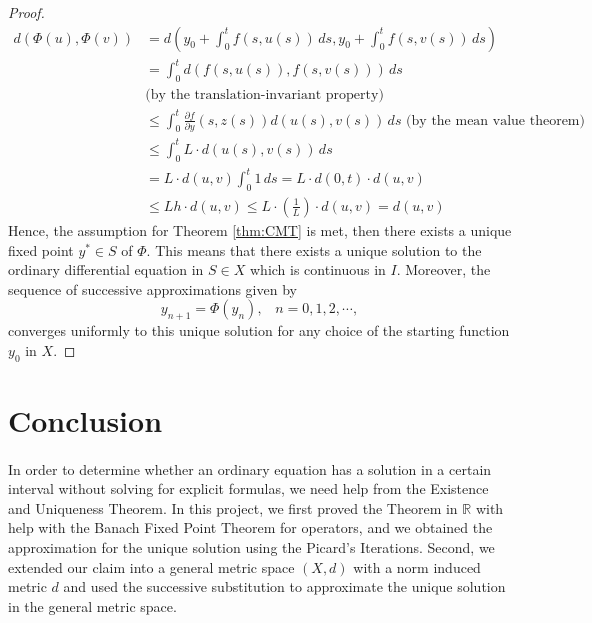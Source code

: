 \documentclass{article}
\theoremstyle{definition}
\theoremstyle{remark}
\theoremstyle{example}
\begin{document}
\begin{proof}
    \begin{align}
        d(\Phi(u),\Phi(v)) &= d\left(y_0+\int_{0}^{t}{f(s,u(s))}\,ds, y_0+\int_{0}^{t}{f(s,v(s))}\,ds\right)\\
        &= \int_{0}^{t}{d(f(s,u(s)), f(s,v(s)))}\,ds\\
        &\text{(by the translation-invariant property)}\\
        &\leq \int_{0}^{t}{\tfrac{\partial f}{\partial y}(s,z(s))d(u(s),v(s))}\,ds \text{ (by the mean value theorem)}\\
        &\leq \int_{0}^{t}{L \cdot d(u(s),v(s))}\,ds\\
        &= L\cdot d(u,v) \int_{0}^{t}{1}\,ds = L \cdot d(0,t) \cdot d(u,v)\\
        &\leq Lh\cdot d(u,v) \leq L \cdot (\tfrac{1}{L})\cdot d(u,v) = d(u,v)
    \end{align}
    Hence, the assumption for Theorem \ref{thm:CMT} is met, then there exists a unique fixed point $y^{*} \in S$ of $\Phi$. This means that there exists a unique solution to the ordinary differential equation in $S \in X$ which is continuous in $I$. Moreover, the sequence of successive approximations given by
    \begin{equation}
       y_{n+1} = \Phi(y_n), \; \; \; n = 0, 1, 2, \cdots,
    \end{equation}
    converges uniformly to this unique solution for any choice of the starting function $y_0$ in $X$.
\end{proof}

\section{Conclusion}

\paragraph{  }

In order to determine whether an ordinary equation has a solution in a certain interval without solving for explicit formulas, we need help from the Existence and Uniqueness Theorem. In this project, we first proved the Theorem in $\mathbb{R}$ with help with the Banach Fixed Point Theorem for operators, and we obtained the approximation for the unique solution using the Picard's Iterations. Second, we extended our claim into a general metric space $(X,d)$ with a norm induced metric $d$ and used the successive substitution to approximate the unique solution in the general metric space.

\newpage


\end{document}
